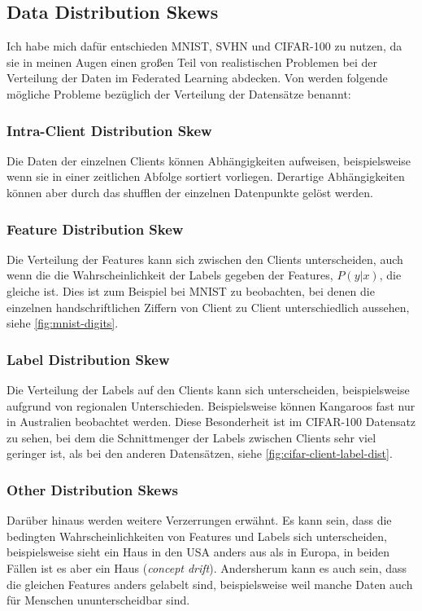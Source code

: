 \subsection{Data Distribution Skews}

Ich habe mich dafür entschieden MNIST, SVHN und CIFAR-100 zu nutzen, da sie in meinen Augen einen großen Teil von realistischen Problemen bei der Verteilung der Daten im Federated Learning abdecken. Von \textcite[p. 18f]{kairouz:2021} werden folgende mögliche Probleme bezüglich der Verteilung der Datensätze benannt:

\subsubsection{Intra-Client Distribution Skew}
Die Daten der einzelnen Clients können Abhängigkeiten aufweisen, beispielsweise wenn sie in einer zeitlichen Abfolge sortiert vorliegen. Derartige Abhängigkeiten können aber durch das shufflen der einzelnen Datenpunkte gelöst werden.

\subsubsection{Feature Distribution Skew}
Die Verteilung der Features kann sich zwischen den Clients unterscheiden, auch wenn die die Wahrscheinlichkeit der Labels gegeben der Features, $P(y|x)$, die gleiche ist. Dies ist zum Beispiel bei MNIST zu beobachten, bei denen die einzelnen handschriftlichen Ziffern von Client zu Client unterschiedlich aussehen, siehe \autoref{fig:mnist-digits}.

\subsubsection{Label Distribution Skew}
Die Verteilung der Labels auf den Clients kann sich unterscheiden, beispielsweise aufgrund von regionalen Unterschieden. Beispielsweise können Kangaroos fast nur in Australien beobachtet werden. Diese Besonderheit ist im CIFAR-100 Datensatz zu sehen, bei dem die Schnittmenger der Labels zwischen Clients sehr viel geringer ist, als bei den anderen Datensätzen, siehe \autoref{fig:cifar-client-label-dist}.

\subsubsection{Other Distribution Skews}
Darüber hinaus werden weitere Verzerrungen erwähnt. Es kann sein, dass die bedingten Wahrscheinlichkeiten von Features und Labels sich unterscheiden, beispielsweise sieht ein Haus in den USA anders aus als in Europa, in beiden Fällen ist es aber ein Haus (\textit{concept drift}). Andersherum kann es auch sein, dass die gleichen Features anders gelabelt sind, beispielsweise weil manche Daten auch für Menschen ununterscheidbar sind.


